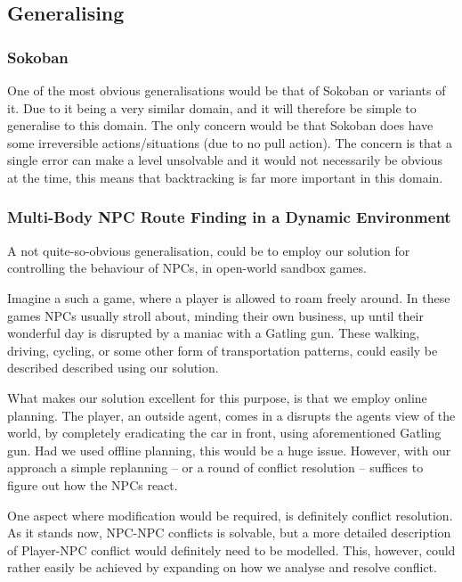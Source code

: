 \documentclass[letterpaper]{article}
\begin{document}
			

	\subsection{Generalising}


		
		\subsubsection{Sokoban}
			One of the most obvious generalisations would be that of Sokoban or variants of it. Due to it being a very similar domain, and it will therefore be simple to generalise to this domain. The only concern would be that Sokoban does have some irreversible actions/situations (due to no pull action). The concern is that a single error can make a level unsolvable and it would not necessarily be obvious at the time, this means that backtracking is far more important in this domain.

		\subsubsection{Multi-Body NPC Route Finding in a Dynamic Environment}
			A not quite-so-obvious generalisation, could be to employ our solution for controlling the behaviour of NPCs, in open-world sandbox games.

			Imagine a such a game, where a player is allowed to roam freely around. In these games NPCs usually stroll about, minding their own business, up until their wonderful day is disrupted by a maniac with a Gatling gun. These walking, driving, cycling, or some other form of transportation patterns, could easily be described described using our solution. 

			What makes our solution excellent for this purpose, is that we employ online planning. The player, an outside agent, comes in a disrupts the agents view of the world, by completely eradicating the car in front, using aforementioned Gatling gun. Had we used offline planning, this would be a huge issue. However, with our approach a simple replanning -- or a round of conflict resolution -- suffices to figure out how the NPCs react.


			One aspect where modification would be required, is definitely conflict resolution. As it stands now, NPC-NPC conflicts is solvable, but a more detailed description of Player-NPC conflict would definitely need to be modelled. This, however, could rather easily be achieved by expanding on how we analyse and resolve conflict.




\end{document}
